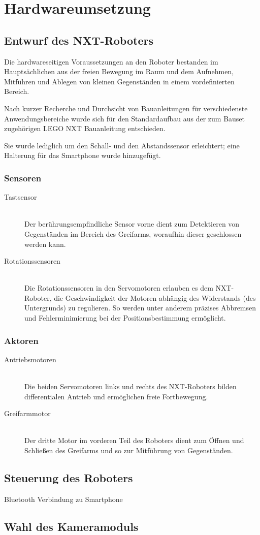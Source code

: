 \chapter{Hardwareumsetzung}
\section{Entwurf des NXT-Roboters}

Die hardwareseitigen Voraussetzungen an den Roboter bestanden im Hauptsächlichen aus der freien Bewegung im Raum und dem Aufnehmen, Mitführen und Ablegen von kleinen Gegenständen in einem vordefinierten Bereich.

Nach kurzer Recherche\cite{building_instructions} und Durchsicht von Bauanleitungen für verschiedenste Anwendungsbereiche wurde sich für den Standardaufbau aus der zum Bauset zugehörigen LEGO NXT Bauanleitung entschieden.

Sie wurde lediglich um den Schall- und den Abstandssensor erleichtert; eine Halterung für das Smartphone wurde hinzugefügt.

\pagebreak

\subsection{Sensoren}

\begin{description}
\item[Tastsensor]\hfill \\
Der berührungsempfindliche Sensor vorne dient zum Detektieren von Gegenständen im Bereich des Greifarms, woraufhin dieser geschlossen werden kann.
\item[Rotationssensoren]\hfill \\
Die Rotationssensoren in den Servomotoren erlauben es dem NXT-Roboter, die Geschwindigkeit der Motoren abhängig des Widerstands (des Untergrunds) zu regulieren. So werden unter anderem präzises Abbremsen und Fehlerminimierung bei der Positionsbestimmung ermöglicht.
\end{description}

\subsection{Aktoren}

\begin{description}
\item[Antriebsmotoren]\hfill \\
Die beiden Servomotoren links und rechts des NXT-Roboters bilden differentialen Antrieb und ermöglichen freie Fortbewegung.
\item[Greifarmmotor]\hfill \\
Der dritte Motor im vorderen Teil des Roboters dient zum Öffnen und Schließen des Greifarms und so zur Mitführung von Gegenständen.
\end{description}

\section{Steuerung des Roboters}
Bluetooth Verbindung zu Smartphone

\section{Wahl des Kameramoduls}
\label{sec:Kamera}
